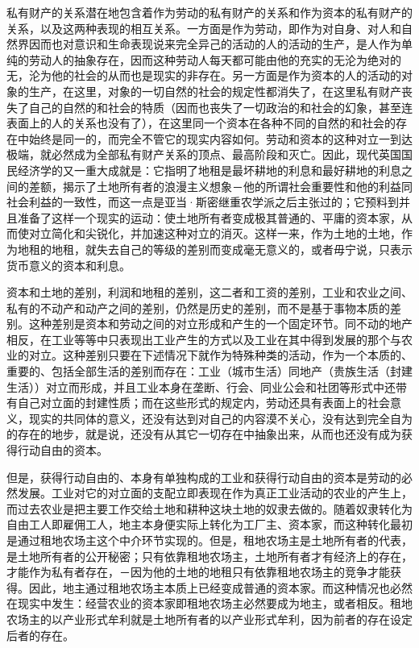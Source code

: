 \documentclass[a4paper,twoside,12pt,AutoFakeBold]{ctexart}
\begin{document}
私有财产的关系潜在地包含着作为劳动的私有财产的关系和作为资本的私有财产的关系，以及这两种表现的相互关系。一方面是作为劳动，即作为对自身、对人和自然界因而也对意识和生命表现说来完全异己的活动的人的活动的生产，是人作为单纯的劳动人的抽象存在，因而这种劳动人每天都可能由他的充实的无沦为绝对的无，沦为他的社会的从而也是现实的非存在。另一方面是作为资本的人的活动的对象的生产，在这里，对象的一切自然的社会的规定性都消失了，在这里私有财产丧失了自己的自然的和社会的特质（因而也丧失了一切政治的和社会的幻象，甚至连表面上的人的关系也没有了），在这里同一个资本在各种不同的自然的和社会的存在中始终是同一的，而完全不管它的现实内容如何。劳动和资本的这种对立一到达极端，就必然成为全部私有财产关系的顶点、最高阶段和灭亡。因此，现代英国国民经济学的又一重大成就是：它指明了地租是最坏耕地的利息和最好耕地的利息之间的差额，揭示了土地所有者的浪漫主义想象－他的所谓社会重要性和他的利益同社会利益的一致性，而这一点是亚当·斯密继重农学派之后主张过的；它预料到并且准备了这样一个现实的运动：使土地所有者变成极其普通的、平庸的资本家，从而使对立简化和尖锐化，并加速这种对立的消灭。这样一来，作为土地的土地，作为地租的地租，就失去自己的等级的差别而变成毫无意义的，或者毋宁说，只表示货币意义的资本和利息。

资本和土地的差别，利润和地租的差别，这二者和工资的差别，工业和农业之间、私有的不动产和动产之间的差别，仍然是历史的差别，而不是基于事物本质的差别。这种差别是资本和劳动之间的对立形成和产生的一个固定环节。同不动的地产相反，在工业等等中只表现出工业产生的方式以及工业在其中得到发展的那个与农业的对立。这种差别只要在下述情况下就作为特殊种类的活动，作为一个本质的、重要的、包括全部生活的差别而存在：工业（城市生活）同地产（贵族生活（封建生活））对立而形成，并且工业本身在垄断、行会、同业公会和社团等形式中还带有自己对立面的封建性质；而在这些形式的规定内，劳动还具有表面上的社会意义，现实的共同体的意义，还没有达到对自己的内容漠不关心，没有达到完全自为的存在的地步，就是说，还没有从其它一切存在中抽象出来，从而也还没有成为获得行动自由的资本。

但是，获得行动自由的、本身有单独构成的工业和获得行动自由的资本是劳动的必然发展。工业对它的对立面的支配立即表现在作为真正工业活动的农业的产生上，而过去农业是把主要工作交给土地和耕种这块土地的奴隶去做的。随着奴隶转化为自由工人即雇佣工人，地主本身便实际上转化为工厂主、资本家，而这种转化最初是通过租地农场主这个中介环节实现的。但是，租地农场主是土地所有者的代表，是土地所有者的公开秘密；只有依靠租地农场主，土地所有者才有经济上的存在，才能作为私有者存在，－因为他的土地的地租只有依靠租地农场主的竞争才能获得。因此，地主通过租地农场主本质上已经变成普通的资本家。而这种情况也必然在现实中发生：经营农业的资本家即租地农场主必然要成为地主，或者相反。租地农场主的以产业形式牟利就是土地所有者的以产业形式牟利，因为前者的存在设定后者的存在。
\end{document}

